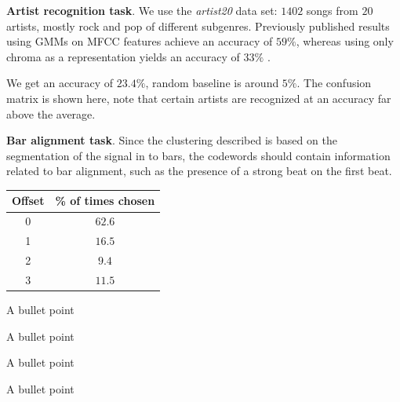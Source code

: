 \documentclass[landscape,a0b,final]{a0poster}
\newenvironment{poster}{
  \begin{center}
  \begin{minipage}[c]{0.98\textwidth}
}{
  \end{minipage} 
  \end{center}
}
\newcommand{\mytablecaption}[1]{
  \vspace{1.0cm}
  \begin{quote}
    {{\sc Table} \arabic{table}: #1}
  \end{quote}
  \vspace{1cm}
  \stepcounter{table}
}
\begin{document}
\begin{poster}
\begin{multicols}{3}
\begin{minipage}[c][9cm][c]{\columnwidth}
\textbf{Artist recognition task}.
We use the {\it artist20} data set: $1402$ songs from $20$ artists, 
mostly rock and pop of different subgenres.  
Previously published results using GMMs on MFCC features achieve an 
accuracy of $59\%$, whereas using only chroma as a representation yields an
accuracy of $33\%$  \cite{Ellis2007}.

We get an accuracy of $\mathbf{23.4\%}$, random baseline 
is around $5\%$. 
The confusion matrix is shown here, note 
that certain artists are recognized at an accuracy far above the average.

\end{minipage}

\vspace{2cm}

\begin{minipage}[c][9cm][c]{\columnwidth}
\textbf{Bar alignment task}.
Since the clustering described is based
on the segmentation of the signal in to bars, 
the codewords should contain information related to bar
alignment, such as the presence of a strong beat on the first beat.\\
\end{minipage}
\begin{minipage}[c][9cm][c]{0.21\textwidth}
  \begin{center}
      \begin{tabular}{cc}
        Offset & \% of times chosen \\ \hline \hline
        0 & $\mathbf{62.6}$\\
        1 & $16.5$\\
        2 & $9.4$\\
        3 & $11.5$
      \end{tabular}
      \label{tab:offset}
  \end{center}
\end{minipage}

\begin{list}{}{\leftmargin=2em =1em}
\item A bullet point
\item A bullet point
\item A bullet point
\item A bullet point
\end{list}



\end{multicols}
\end{poster}
\end{document}
